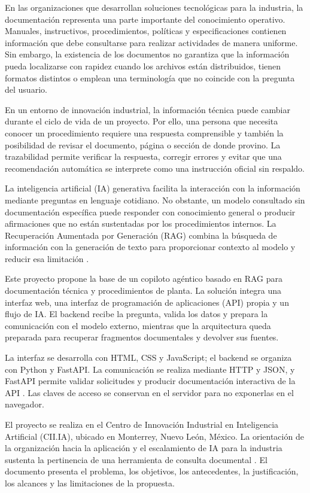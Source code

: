En las organizaciones que desarrollan soluciones tecnológicas para la industria, la documentación representa una parte importante del conocimiento operativo. Manuales, instructivos, procedimientos, políticas y especificaciones contienen información que debe consultarse para realizar actividades de manera uniforme. Sin embargo, la existencia de los documentos no garantiza que la información pueda localizarse con rapidez cuando los archivos están distribuidos, tienen formatos distintos o emplean una terminología que no coincide con la pregunta del usuario.

En un entorno de innovación industrial, la información técnica puede cambiar durante el ciclo de vida de un proyecto. Por ello, una persona que necesita conocer un procedimiento requiere una respuesta comprensible y también la posibilidad de revisar el documento, página o sección de donde provino. La trazabilidad permite verificar la respuesta, corregir errores y evitar que una recomendación automática se interprete como una instrucción oficial sin respaldo.

La inteligencia artificial (IA) generativa facilita la interacción con la información mediante preguntas en lenguaje cotidiano. No obstante, un modelo consultado sin documentación específica puede responder con conocimiento general o producir afirmaciones que no están sustentadas por los procedimientos internos. La Recuperación Aumentada por Generación (RAG) combina la búsqueda de información con la generación de texto para proporcionar contexto al modelo y reducir esa limitación \cite{lewis2020rag,gao2023rag}.

Este proyecto propone la base de un copiloto agéntico basado en RAG para documentación técnica y procedimientos de planta. La solución integra una interfaz web, una interfaz de programación de aplicaciones (API) propia y un flujo de IA. El backend recibe la pregunta, valida los datos y prepara la comunicación con el modelo externo, mientras que la arquitectura queda preparada para recuperar fragmentos documentales y devolver sus fuentes.

La interfaz se desarrolla con HTML, CSS y JavaScript; el backend se organiza con Python y FastAPI. La comunicación se realiza mediante HTTP y JSON, y FastAPI permite validar solicitudes y producir documentación interactiva de la API \cite{fastapiDocs}. Las claves de acceso se conservan en el servidor para no exponerlas en el navegador.

El proyecto se realiza en el Centro de Innovación Industrial en Inteligencia Artificial (CII.IA), ubicado en Monterrey, Nuevo León, México. La orientación de la organización hacia la aplicación y el escalamiento de IA para la industria sustenta la pertinencia de una herramienta de consulta documental \cite{ciiia2026,ciiia2026b}. El documento presenta el problema, los objetivos, los antecedentes, la justificación, los alcances y las limitaciones de la propuesta.


